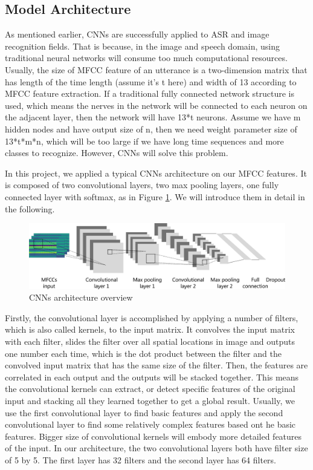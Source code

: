 \documentclass{article}
\begin{document}
\subsection{Model Architecture}

As mentioned earlier, CNNs are successfully applied to ASR and image recognition fields. That is because, in the image and speech domain, using traditional neural networks will consume too much computational resources. Usually, the size of MFCC feature of an utterance is a two-dimension matrix that has length of the time length (assume it's t here) and width of 13 according to MFCC feature extraction. If a traditional fully connected network structure is used, which means the nerves in the network will be connected to each neuron on the adjacent layer, then the network will have 13*t neurons. Assume we have m hidden nodes and have output size of n, then we need weight parameter size of 13*t*m*n, which will be too large if we have long time sequences and more classes to recognize. However, CNNs will solve this problem.

In this project, we applied a typical CNNs architecture on our MFCC features. It is composed of two convolutional layers, two max pooling layers, one fully connected layer with softmax, as in Figure \ref{fig:cnn}. We will introduce them in detail in the following.

\begin{figure}[h!]
\centering
\includegraphics[width=\textwidth]{cnnarchitecture.png}
\caption{CNNs architecture overview}
\label{fig:cnn}
\end{figure}

Firstly, the convolutional layer is accomplished by applying a number of filters, which is also called kernels, to the input matrix. It convolves the input matrix with each filter, slides the filter over all spatial locations in image and outputs one number each time, which is the dot product between the filter and the convolved input matrix that has the same size of the filter. Then, the features are correlated in each output and the outputs will be stacked together. This means the convolutional kernels can extract, or detect specific features of the original input and stacking all they learned together to get a global result. Usually, we use the first convolutional layer to find basic features and apply the second convolutional layer to find some relatively complex features based ont he basic features. Bigger size of convolutional kernels will embody more detailed features of the input. In our architecture, the two convolutional layers both have filter size of 5 by 5. The first layer has 32 filters and the second layer has 64 filters.
\end{document}
